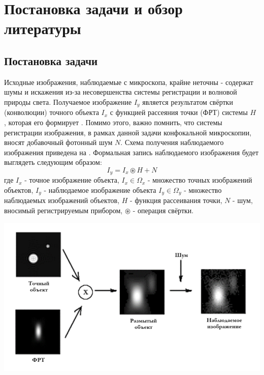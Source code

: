 \chapter{Постановка задачи и обзор литературы} \label{ch1}
\section{Постановка задачи} \label{ch1:sec1}
\par Исходные изображения, наблюдаемые с микроскопа, крайне неточны - содержат шумы и искажения из-за несовершенства системы регистрации и волновой природы света. Получаемое изображение $I_y$ является результатом свёртки (конволюции) точного объекта $I_x$ с функцией рассеяния точки (ФРТ) системы $H$ , которая его формирует \cite[с. 223—225]{Sibarita2005}. Помимо этого, важно помнить, что системы регистрации изображения, в рамках данной задачи конфокальной микроскопии, вносят добавочный фотонный шум $N$. Схема получения наблюдаемого изображения приведена на . Формальная запись наблюдаемого изображения будет выглядеть следующим образом:
\begin{equation}\label{eq:problem}
	I_y = I_x \circledast H + N
\end{equation}
где $I_x$ - точное изображение объекта, $I_x \in \Omega_x$ - множество точных изображений объектов, $I_y$ - наблюдаемое изображение объекта $I_y \in \Omega_y$ - множество наблюдаемых изображений объектов, $H$ - функция рассеивания точки, $N$ - шум, вносимый регистрируемым прибором, $\circledast$ - операция свёртки.
\begin{minipage}{\textwidth}
	\centering
	\vspace{\mfloatsep} %
	\includegraphics[keepaspectratio=true,scale=0.55] {my_folder/images/problem/start.png}
	\label{fig:problem-start}  
	\vspace{\mfloatsep} %
\end{minipage}
